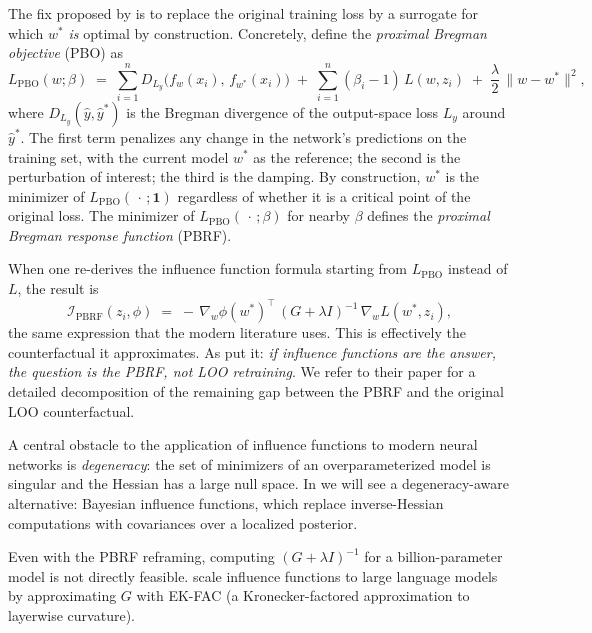 \documentclass[11pt]{article}
\begin{document}
The fix proposed by \citet{bae2022if} is to replace the original training loss by a surrogate for which $w^*$ \emph{is} optimal by construction. Concretely, define the \emph{proximal Bregman objective} (PBO) as
\begin{equation}
  L_{\mathrm{PBO}}(w;\beta) \;=\; \sum_{i=1}^{n} D_{L_y}\!\bigl(f_w(x_i),\,f_{w^*}(x_i)\bigr) \;+\; \sum_{i=1}^{n}(\beta_i - 1)\,L(w,z_i) \;+\; \frac{\lambda}{2}\,\|w - w^*\|^2,
  \label{eq:pbo}
\end{equation}
where $D_{L_y}(\hat y,\hat y^*)$ is the Bregman divergence of the output-space loss $L_y$ around $\hat y^*$. The first term penalizes any change in the network's predictions on the training set, with the current model $w^*$ as the reference; the second is the perturbation of interest; the third is the damping. By construction, $w^*$ is the minimizer of $L_{\mathrm{PBO}}(\,\cdot\,;\mathbf{1})$ regardless of whether it is a critical point of the original loss. The minimizer of $L_{\mathrm{PBO}}(\,\cdot\,;\beta)$ for nearby $\beta$ defines the \emph{proximal Bregman response function} (PBRF).

When one re-derives the influence function formula starting from $L_{\mathrm{PBO}}$ instead of $L$, the result is
\begin{equation}
  \mathcal{I}_{\mathrm{PBRF}}(z_i,\phi) \;=\; -\,\nabla_w\phi(w^*)^\top\,(G + \lambda I)^{-1}\,\nabla_w L(w^*,z_i),
  \label{eq:if-pbrf}
\end{equation}
the same expression that the modern literature uses.
This is effectively the counterfactual it approximates. As \citet{bae2022if} put it: \emph{if influence functions are the answer, the question is the PBRF, not LOO retraining}. We refer to their paper for a detailed decomposition of the remaining gap between the PBRF and the original LOO counterfactual.

\begin{remark}\label{rem:slt-connection}
A central obstacle to the application of influence functions to modern neural networks is \emph{degeneracy}: the set of minimizers of an overparameterized model is singular and the Hessian has a large null space. In  we will see a degeneracy-aware alternative: Bayesian influence functions, which replace inverse-Hessian computations with covariances over a localized posterior.
\end{remark}

\begin{remark}\label{rem:scaling}
Even with the PBRF reframing, computing $(G + \lambda I)^{-1}$ for a billion-parameter model is not directly feasible. \citet{grosse2023studying} scale influence functions to large language models by approximating $G$ with EK-FAC (a Kronecker-factored approximation to layerwise curvature).
\end{remark}
\end{document}
